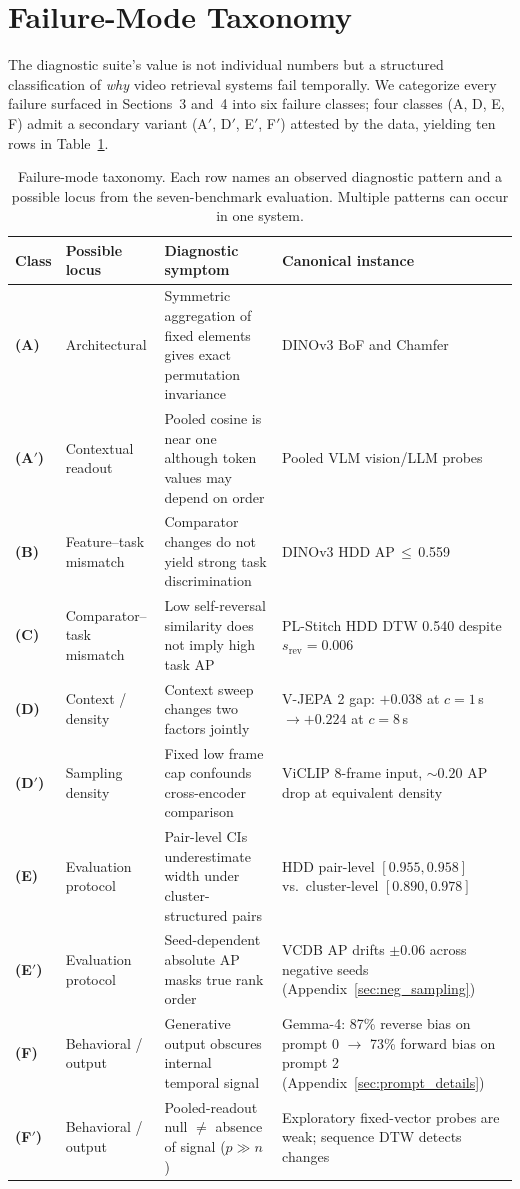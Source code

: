 \documentclass{article}
\theoremstyle{remark}
\begin{document}
\section{Failure-Mode Taxonomy}
\label{sec:failure_taxonomy}

The diagnostic suite's value is not individual numbers but a structured classification of \emph{why} video retrieval systems fail temporally. We categorize every failure surfaced in Sections~3 and~4 into six failure classes; four classes (A, D, E, F) admit a secondary variant (A$'$, D$'$, E$'$, F$'$) attested by the data, yielding ten rows in Table~\ref{tab:failure_taxonomy}.

\begin{table}[h]
\centering
\small
\caption{Failure-mode taxonomy. Each row names an observed diagnostic pattern and a possible locus from the seven-benchmark evaluation. Multiple patterns can occur in one system.}
\label{tab:failure_taxonomy}
\begin{tabular}{p{0.7cm}p{2.0cm}p{3.8cm}p{5.4cm}}
\toprule
\textbf{Class} & \textbf{Possible locus} & \textbf{Diagnostic symptom} & \textbf{Canonical instance} \\
\midrule
\textbf{(A)} & Architectural & Symmetric aggregation of fixed elements gives exact permutation invariance & DINOv3 BoF and Chamfer \\
\textbf{(A$'$)} & Contextual readout & Pooled cosine is near one although token values may depend on order & Pooled VLM vision/LLM probes \\
\textbf{(B)} & Feature--task mismatch & Comparator changes do not yield strong task discrimination & DINOv3 HDD AP\,$\leq$\,0.559 \\
\textbf{(C)} & Comparator--task mismatch & Low self-reversal similarity does not imply high task AP & PL-Stitch HDD DTW 0.540 despite $s_\text{rev}\!=\!0.006$ \\
\textbf{(D)} & Context / density & Context sweep changes two factors jointly & V-JEPA 2 gap: $+0.038$ at $c\!=\!1$\,s $\to +0.224$ at $c\!=\!8$\,s \\
\textbf{(D$'$)} & Sampling density & Fixed low frame cap confounds cross-encoder comparison & ViCLIP 8-frame input, ${\sim}0.20$ AP drop at equivalent density \\
\textbf{(E)} & Evaluation protocol & Pair-level CIs underestimate width under cluster-structured pairs & HDD pair-level $[0.955, 0.958]$ vs.\ cluster-level $[0.890, 0.978]$ \\
\textbf{(E$'$)} & Evaluation protocol & Seed-dependent absolute AP masks true rank order & VCDB AP drifts ${\pm}0.06$ across negative seeds (Appendix~\ref{sec:neg_sampling}) \\
\textbf{(F)} & Behavioral / output & Generative output obscures internal temporal signal & Gemma-4: 87\% reverse bias on prompt 0 $\to$ 73\% forward bias on prompt 2 (Appendix~\ref{sec:prompt_details}) \\
\textbf{(F$'$)} & Behavioral / output & Pooled-readout null $\ne$ absence of signal ($p\!\gg\!n$) & Exploratory fixed-vector probes are weak; sequence DTW detects changes \\
\bottomrule
\end{tabular}
\end{table}
\end{document}
